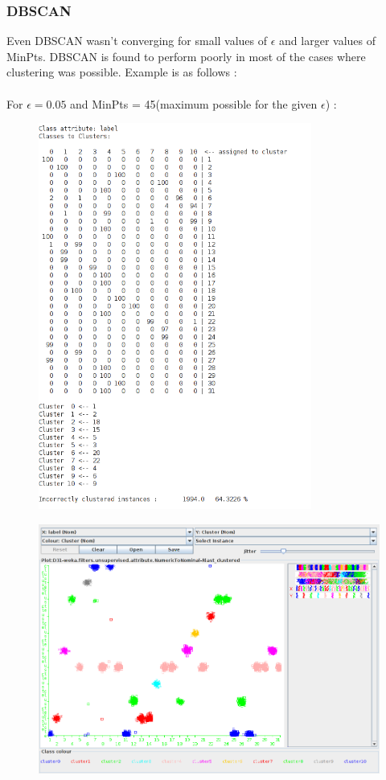 \documentclass[paper=a4, fontsize=11pt]{scrartcl}
\numberwithin{equation}{section}		%
\numberwithin{figure}{section}			%
\numberwithin{table}{section}				%
\begin{document}
\subsubsection*{DBSCAN}
Even DBSCAN wasn't converging for small values of $\epsilon$ and larger values of MinPts. DBSCAN is found to perform poorly in most of the cases where clustering was possible. Example is as follows :\\\\
For $\epsilon = 0.05$ and MinPts = 45(maximum possible for the given $\epsilon$) :
\begin{figure}[H]
	\centering
  \includegraphics[width=0.8\textwidth]{6db}
\end{figure}

\begin{figure}[H]
	\centering
  \includegraphics[width=1\textwidth]{6db2}{\label{k=50: f1 vs f2}}
\end{figure}
\end{document}
